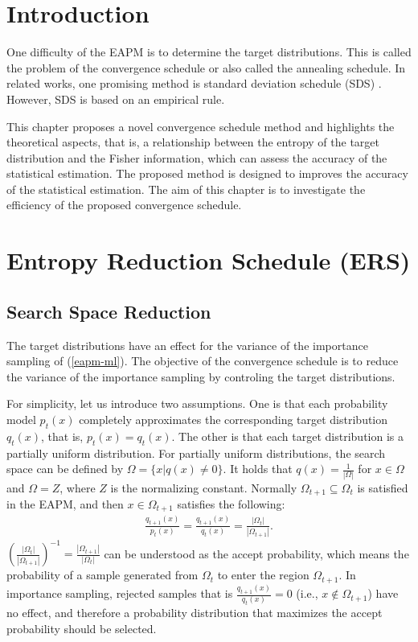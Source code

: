 \section{Introduction}
One difficulty of the EAPM is 
to determine the target distributions.
This is called the problem of the convergence schedule or also called
the annealing schedule.
In related works,
one promising method is standard deviation schedule (SDS) 
\cite{thilo:sds,thilo:sds2}.
However, SDS is based on an empirical rule.

This chapter proposes a novel convergence schedule method and
highlights the theoretical aspects,
that is,
a relationship between the entropy of the target distribution
and the Fisher information, which can assess the
accuracy of the statistical estimation.
The proposed method is designed to improves the accuracy of the
statistical estimation.
The aim of this chapter is to investigate the 
efficiency of the proposed convergence schedule.



\section{Entropy Reduction Schedule (ERS)}
\subsection{Search Space Reduction}
The target distributions have an effect for
the variance of the importance sampling of (\ref{eapm-ml}).
The objective of the convergence schedule is to reduce the variance
of the importance sampling 
by controling the target distributions.

For simplicity, let us introduce two assumptions.
One is that
each probability model $p_t(x)$ completely approximates the corresponding 
target distribution $q_t(x)$, that is, $p_t(x)=q_t(x)$.
The other is that 
each target distribution is a partially uniform distribution.
For partially uniform distributions, 
the search space can be defined by $\Omega=\{x|q(x) \neq 0\}$.
It holds that $q(x)=\frac{1}{|\Omega|}$
for $x \in \Omega$
and $\Omega=Z$, where $Z$ is the normalizing constant.
Normally $\Omega_{t+1} \subseteq \Omega_t$ is satisfied in the EAPM,
 and then $x \in \Omega_{t+1}$ satisfies the following:
\begin{eqnarray}
 \frac{q_{t+1}(x)}{p_t(x)} 
=
 \frac{q_{t+1}(x)}{q_t(x)} 
= 
  \frac{|\Omega_{t}|}{|\Omega_{t+1}|}.
\label{ent_schedule_assume}
\end{eqnarray}
$(\frac{|\Omega_{t}|}{|\Omega_{t+1}|})^{-1}=
\frac{|\Omega_{t+1}|}{|\Omega_{t}|}$ can be
understood as the accept probability, which means
the probability of a sample generated from $\Omega_t$
to enter the region $\Omega_{t+1}$.
In importance sampling,
rejected samples that is $\frac{q_{t+1}(x)}{q_t(x)}=0$ (i.e., $x \not \in \Omega_{t+1}$)
have no effect,
and therefore a probability distribution
that maximizes the accept probability should be selected. 

